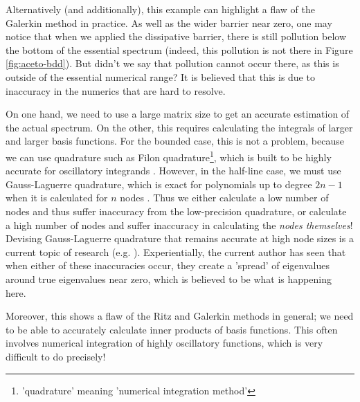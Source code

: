 \documentclass[../main.tex]{subfiles}
\begin{document}
Alternatively (and additionally), this example can highlight
a flaw of the Galerkin method in practice. As well as the wider barrier near zero,
one may notice that when we applied the dissipative barrier,
there is still pollution below the bottom of the essential spectrum (indeed, this pollution
is not there in Figure \ref{fig:aceto-bdd}). But didn't we say that pollution cannot occur there,
as this is outside of the essential numerical range? It is believed that this is due to inaccuracy
in the numerics that are hard to resolve. 

On one hand, we need to use a large matrix size to
get an accurate estimation of the actual spectrum. On the other, this requires calculating
the integrals of larger and larger basis functions. For the bounded case, this is not a problem,
because we can use quadrature such as Filon quadrature\footnote{'quadrature' meaning 'numerical
integration method'}, which is built to be highly accurate
for oscillatory integrands \cite{chase1969algorithm}. However, in the half-line case, we must
use Gauss-Laguerre quadrature, which is exact for polynomials up to degree $2n-1$ when it is
calculated for $n$ nodes \cite{suli2003introduction}. Thus we either calculate a low number
of nodes and thus suffer inaccuracy from the low-precision quadrature, or calculate a high
number of nodes and suffer inaccuracy in calculating the \emph{nodes themselves}! Devising
Gauss-Laguerre quadrature that remains accurate at high node sizes is a current topic of
research (e.g. \cite{gil2019fast}). Experientially, the current author has seen that when either of
these inaccuracies occur, they create a 'spread' of eigenvalues around true eigenvalues
near zero, which is believed to be what is happening here.

Moreover, this shows a flaw of the Ritz and Galerkin methods in general; we need to be able to
accurately calculate inner products of basis functions. This often involves numerical integration
of highly oscillatory functions, which is very difficult to do precisely!
\end{document}
